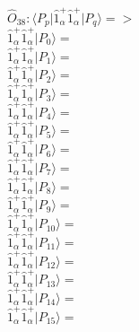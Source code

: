 \documentclass[14pt]{article}
\begin{document}
    $\hat{O}_{38}:  \langle{P_p}\vert \hat{1}_{\alpha}^{+}\hat{1}_{\alpha}^{+} \vert{P_q}\rangle => $ \\ 
    $ \hat{1}_{\alpha}^{+}\hat{1}_{\alpha}^{+} \vert{P_{0}}\rangle =  $ \\ 
    $ \hat{1}_{\alpha}^{+}\hat{1}_{\alpha}^{+} \vert{P_{1}}\rangle =  $ \\ 
    $ \hat{1}_{\alpha}^{+}\hat{1}_{\alpha}^{+} \vert{P_{2}}\rangle =  $ \\ 
    $ \hat{1}_{\alpha}^{+}\hat{1}_{\alpha}^{+} \vert{P_{3}}\rangle =  $ \\ 
    $ \hat{1}_{\alpha}^{+}\hat{1}_{\alpha}^{+} \vert{P_{4}}\rangle =  $ \\ 
    $ \hat{1}_{\alpha}^{+}\hat{1}_{\alpha}^{+} \vert{P_{5}}\rangle =  $ \\ 
    $ \hat{1}_{\alpha}^{+}\hat{1}_{\alpha}^{+} \vert{P_{6}}\rangle =  $ \\ 
    $ \hat{1}_{\alpha}^{+}\hat{1}_{\alpha}^{+} \vert{P_{7}}\rangle =  $ \\ 
    $ \hat{1}_{\alpha}^{+}\hat{1}_{\alpha}^{+} \vert{P_{8}}\rangle =  $ \\ 
    $ \hat{1}_{\alpha}^{+}\hat{1}_{\alpha}^{+} \vert{P_{9}}\rangle =  $ \\ 
    $ \hat{1}_{\alpha}^{+}\hat{1}_{\alpha}^{+} \vert{P_{10}}\rangle =  $ \\ 
    $ \hat{1}_{\alpha}^{+}\hat{1}_{\alpha}^{+} \vert{P_{11}}\rangle =  $ \\ 
    $ \hat{1}_{\alpha}^{+}\hat{1}_{\alpha}^{+} \vert{P_{12}}\rangle =  $ \\ 
    $ \hat{1}_{\alpha}^{+}\hat{1}_{\alpha}^{+} \vert{P_{13}}\rangle =  $ \\ 
    $ \hat{1}_{\alpha}^{+}\hat{1}_{\alpha}^{+} \vert{P_{14}}\rangle =  $ \\ 
    $ \hat{1}_{\alpha}^{+}\hat{1}_{\alpha}^{+} \vert{P_{15}}\rangle =  $ \\ 
    
\end{document}
